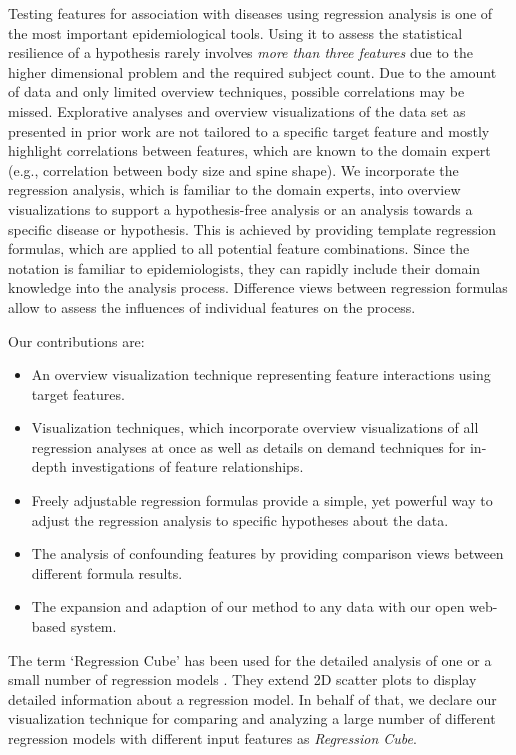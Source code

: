 \documentclass[journal]{style/vgtc} 			          %
\begin{document}
Testing features for association with diseases using regression analysis is one of the most important epidemiological tools.
Using it to assess the statistical resilience of a hypothesis rarely involves \emph{more than three features} due to the higher dimensional problem and the required subject count.
Due to the amount of data and only limited overview techniques, possible correlations may be missed.
Explorative analyses and overview visualizations of the data set as presented in prior work \cite{Klemm2014VIS} are not tailored to a specific target feature and mostly highlight correlations between features, which are known to the domain expert (e.g., correlation between body size and spine shape).
We incorporate the regression analysis, which is familiar to the domain experts, into overview visualizations to support a hypothesis-free analysis or an analysis towards a specific disease or hypothesis.
This is achieved by providing template regression formulas, which are applied to all potential feature combinations.
Since the notation is familiar to epidemiologists, they can rapidly include their domain knowledge into the analysis process.
Difference views between regression formulas allow to assess the influences of individual features on the process.

Our contributions are:
\begin{itemize}
	\item An overview visualization technique representing feature interactions using target features.
	\item Visualization techniques, which incorporate overview visualizations of all regression analyses at once as well as details on demand techniques for in-depth investigations of feature relationships.
	\item Freely adjustable regression formulas provide a simple, yet powerful way to adjust the regression analysis to specific hypotheses about the data.
	\item The analysis of confounding features by providing comparison views between different formula results.
	\item The expansion and adaption of our method to any data with our open web-based system.
\end{itemize}
The term `Regression Cube' has been used for the detailed analysis of one or a small number of regression models \cite{Ahmadi, Chan}.
They extend 2D scatter plots to display detailed information about a regression model.
In behalf of that, we declare our visualization technique for comparing and analyzing a large number of different regression models with different input features as \emph{Regression Cube}.
\end{document}
